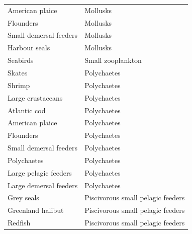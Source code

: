 \begin{singlespace}
\begin{table}[h!]
\begin{tabular}{|l|l|}
    American plaice        & Mollusks   \\
    Flounders              & Mollusks   \\
    Small demersal feeders & Mollusks   \\
    Harbour seals          & Mollusks   \\
    Seabirds               & Small zooplankton  \\
    Skates                 & Polychaetes    \\
    Shrimp                 & Polychaetes    \\
    Large crustaceans      & Polychaetes    \\
    Atlantic cod           & Polychaetes    \\
    American plaice        & Polychaetes    \\
    Flounders              & Polychaetes    \\
    Small demersal feeders & Polychaetes    \\
    Polychaetes            & Polychaetes    \\
    Large pelagic feeders  & Polychaetes    \\
    Large demersal feeders & Polychaetes    \\
    Grey seals             & Piscivorous small pelagic feeders  \\
    Greenland halibut      & Piscivorous small pelagic feeders  \\
    Redfish                & Piscivorous small pelagic feeders  \\
    \hline
  \end{tabular}
\end{table}
\end{singlespace}
